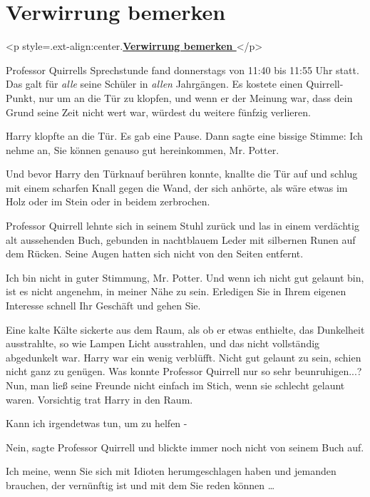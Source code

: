 
\chapter{Verwirrung bemerken}




		<p style=\grqq{}.ext-align:center\grqq{}.\textbf{\underline{Verwirrung
		bemerken }}</p>

Professor Quirrells Sprechstunde fand donnerstags von 11:40 bis 11:55 Uhr statt.
Das galt für \emph{alle} seine Schüler in \emph{allen} Jahrgängen. Es kostete
einen Quirrell-Punkt, nur um an die Tür zu klopfen, und wenn er der Meinung war,
dass dein Grund seine Zeit nicht wert war, würdest du weitere fünfzig verlieren.

Harry klopfte an die Tür. Es gab eine Pause. Dann sagte eine bissige Stimme:
\glqq Ich nehme an, Sie können genauso gut hereinkommen, Mr. Potter.\grqq{}

Und bevor Harry den Türknauf berühren konnte, knallte die Tür auf und schlug mit
einem scharfen Knall gegen die Wand, der sich anhörte, als wäre etwas im Holz
oder im Stein oder in beidem zerbrochen.

Professor Quirrell lehnte sich in seinem Stuhl zurück und las in einem
verdächtig alt aussehenden Buch, gebunden in nachtblauem Leder mit silbernen
Runen auf dem Rücken. Seine Augen hatten sich nicht von den Seiten entfernt.

\glqq Ich bin nicht in guter Stimmung, Mr. Potter. Und wenn ich nicht gut
gelaunt bin, ist es nicht angenehm, in meiner Nähe zu sein. Erledigen Sie in
Ihrem eigenen Interesse schnell Ihr Geschäft und gehen Sie.\grqq{}

Eine kalte Kälte sickerte aus dem Raum, als ob er etwas enthielte, das
Dunkelheit ausstrahlte, so wie Lampen Licht ausstrahlen, und das nicht
vollständig abgedunkelt war. Harry war ein wenig verblüfft. Nicht gut gelaunt zu
sein, schien nicht ganz zu genügen. Was konnte Professor Quirrell nur so sehr
beunruhigen...? Nun, man ließ seine Freunde nicht einfach im Stich, wenn sie
schlecht gelaunt waren. Vorsichtig trat Harry in den Raum.

\glqq Kann ich irgendetwas tun, um zu helfen -\grqq{}

\glqq Nein\grqq{}, sagte Professor Quirrell und blickte immer noch nicht von
seinem Buch auf.

\glqq Ich meine, wenn Sie sich mit Idioten herumgeschlagen haben und jemanden
brauchen, der vernünftig ist und mit dem Sie reden können …\grqq{}

